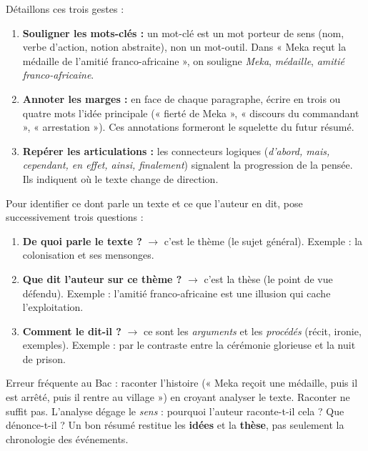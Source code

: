 \documentclass[11pt]{article}
\newcommand{\cle}[1]{{\popxbold\color{popdark}#1}}
\begin{document}
Détaillons ces trois gestes :

\begin{enumerate}
\item \textbf{Souligner les mots-clés :} un mot-clé est un mot porteur de sens (nom, verbe d'action, notion abstraite), non un mot-outil. Dans « Meka reçut la médaille de l'amitié franco-africaine », on souligne \emph{Meka}, \emph{médaille}, \emph{amitié franco-africaine}.
\item \textbf{Annoter les marges :} en face de chaque paragraphe, écrire en trois ou quatre mots l'idée principale (« fierté de Meka », « discours du commandant », « arrestation »). Ces annotations formeront le squelette du futur résumé.
\item \textbf{Repérer les articulations :} les connecteurs logiques (\emph{d'abord, mais, cependant, en effet, ainsi, finalement}) signalent la progression de la pensée. Ils indiquent où le texte change de direction.
\end{enumerate}

\begin{methode}
Pour identifier ce dont parle un texte et ce que l'auteur en dit, pose successivement trois questions :
\begin{enumerate}
\item \textbf{De quoi parle le texte ?} $\rightarrow$ c'est le \cle{thème} (le sujet général). Exemple : la colonisation et ses mensonges.
\item \textbf{Que dit l'auteur sur ce thème ?} $\rightarrow$ c'est la \cle{thèse} (le point de vue défendu). Exemple : l'amitié franco-africaine est une illusion qui cache l'exploitation.
\item \textbf{Comment le dit-il ?} $\rightarrow$ ce sont les \emph{arguments} et les \emph{procédés} (récit, ironie, exemples). Exemple : par le contraste entre la cérémonie glorieuse et la nuit de prison.
\end{enumerate}
\end{methode}

\begin{attention}
Erreur fréquente au Bac : raconter l'histoire (« Meka reçoit une médaille, puis il est arrêté, puis il rentre au village ») en croyant analyser le texte. Raconter ne suffit pas. L'analyse dégage le \emph{sens} : pourquoi l'auteur raconte-t-il cela ? Que dénonce-t-il ? Un bon résumé restitue les \textbf{idées} et la \textbf{thèse}, pas seulement la chronologie des événements.
\end{attention}
\end{document}

